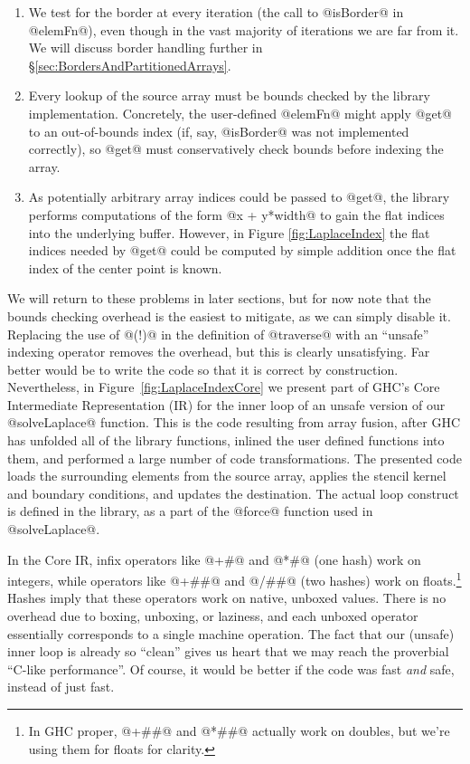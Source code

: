 \begin{enumerate}
\item	We test for the border at every iteration (the call to @isBorder@ in @elemFn@), even though in the vast majority of iterations we are far from it. We will discuss border handling further in \S\ref{sec:BordersAndPartitionedArrays}.

\item	Every lookup of the source array must be bounds checked by the library implementation. 
Concretely, the user-defined @elemFn@ might apply @get@ to an out-of-bounds index (if, say,
@isBorder@ was not implemented correctly), so @get@ must conservatively check bounds before
indexing the array.

\item	As potentially arbitrary array indices could be passed to @get@, the library performs computations of the form @x + y*width@ to gain the flat indices into the underlying buffer. However, in Figure \ref{fig:LaplaceIndex} the flat indices needed by @get@ could be computed by simple addition once the flat index of the center point is known.
\end{enumerate}

We will return to these problems in later sections, but for now note that the bounds checking overhead is the easiest to mitigate, as we can simply disable it. Replacing the use of @(!)@ in the definition of @traverse@ with an ``unsafe'' indexing operator removes the overhead, but this is clearly unsatisfying. Far better would be to write the code so that it is correct by construction. Nevertheless, in Figure~\ref{fig:LaplaceIndexCore} we present part of GHC's Core Intermediate Representation (IR) for the inner loop of an unsafe version of our @solveLaplace@ function. This is the code resulting from array fusion, after GHC has unfolded all of the library functions, inlined the user defined functions into them, and performed a large number of code transformations. The presented code loads the surrounding elements from the source array, applies the stencil kernel and boundary conditions, and updates the destination. The actual loop construct is defined in the library, as a part of the @force@ function used in @solveLaplace@.

In the Core IR, infix operators like @+#@ and @*#@ (one hash) work on integers, while operators like @+##@ and @/##@ (two hashes) work on floats.\footnote{In GHC proper, @+\#\#@ and @*\#\#@ actually work on doubles, but we're using them for floats for clarity.} Hashes imply that these operators work on native, unboxed values. There is no overhead due to boxing, unboxing, or laziness, and each unboxed operator essentially corresponds to a single machine operation. The fact that our (unsafe) inner loop is already so ``clean'' gives us heart that we may reach the proverbial ``C-like performance''. Of course, it would be better if the code was fast \emph{and} safe, instead of just fast.

